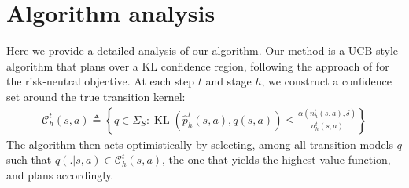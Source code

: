 \documentclass[final,12pt]{colt2026} %
\begin{document}
\section{Algorithm analysis}\label{Algorithm analysis}
\label{proofsupperbound}
Here we provide a detailed analysis of our algorithm. Our method is a UCB-style algorithm that plans over a KL confidence region, following the approach of \citet{Menard2021Fast} for the risk-neutral objective. At each step $t$ and stage $h$, we construct a confidence set around the true transition kernel:
\begin{align*}
    \mathcal{C}_h^t(s, a) \triangleq \left\{ q \in \Sigma_S : \operatorname{KL}\left(\widehat{p}_h^t(s, a), q(s, a)\right) \le \frac{\alpha(n_h^t(s, a), \delta)}{n_h^t(s, a)} \right\}
\end{align*}
The algorithm then acts optimistically by selecting, among all transition models $q$ such that $q(.|s,a) \in \mathcal{C}_h^t(s, a) $, the one that yields the highest value function, and plans accordingly.
\end{document}
